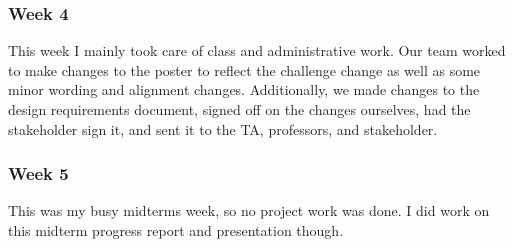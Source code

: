 \subsubsection{Week 4}
This week I mainly took care of class and administrative work. Our team worked to make changes to the poster to reflect the challenge change as well as some minor wording and alignment changes. Additionally, we made changes to the design requirements document, signed off on the changes ourselves, had the stakeholder sign it, and sent it to the TA, professors, and stakeholder.

\subsubsection{Week 5}
This was my busy midterms week, so no project work was done. I did work on this midterm progress report and presentation though.


